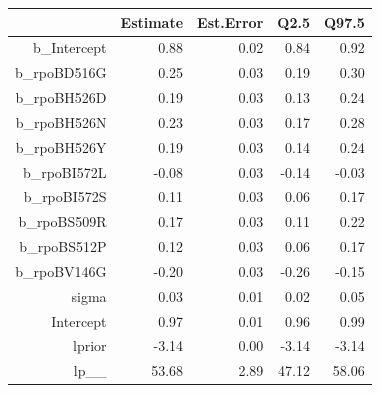 \begin{table}[ht]
\centering
\begin{tabular}{rrrrr}
  \hline
 & Estimate & Est.Error & Q2.5 & Q97.5 \\ 
  \hline
b\_Intercept & 0.88 & 0.02 & 0.84 & 0.92 \\ 
  b\_rpoBD516G & 0.25 & 0.03 & 0.19 & 0.30 \\ 
  b\_rpoBH526D & 0.19 & 0.03 & 0.13 & 0.24 \\ 
  b\_rpoBH526N & 0.23 & 0.03 & 0.17 & 0.28 \\ 
  b\_rpoBH526Y & 0.19 & 0.03 & 0.14 & 0.24 \\ 
  b\_rpoBI572L & -0.08 & 0.03 & -0.14 & -0.03 \\ 
  b\_rpoBI572S & 0.11 & 0.03 & 0.06 & 0.17 \\ 
  b\_rpoBS509R & 0.17 & 0.03 & 0.11 & 0.22 \\ 
  b\_rpoBS512P & 0.12 & 0.03 & 0.06 & 0.17 \\ 
  b\_rpoBV146G & -0.20 & 0.03 & -0.26 & -0.15 \\ 
  sigma & 0.03 & 0.01 & 0.02 & 0.05 \\ 
  Intercept & 0.97 & 0.01 & 0.96 & 0.99 \\ 
  lprior & -3.14 & 0.00 & -3.14 & -3.14 \\ 
  lp\_\_ & 53.68 & 2.89 & 47.12 & 58.06 \\ 
   \hline
\end{tabular}
\end{table}
